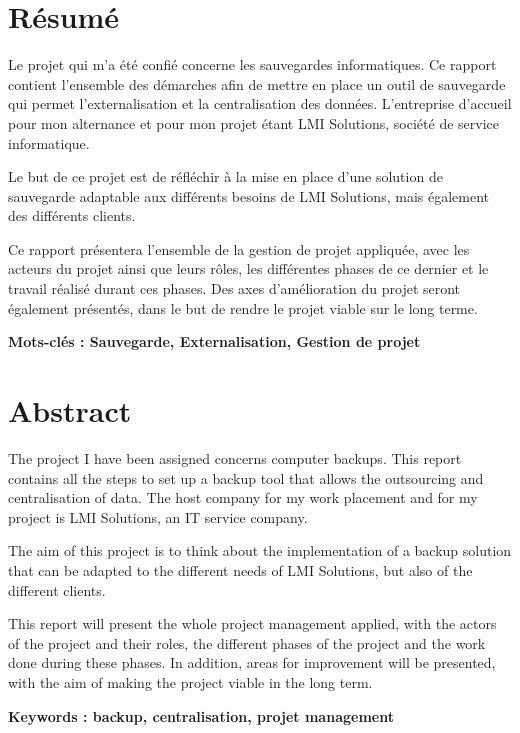 \documentclass[pfe]{tnreport} %
\begin{document}
\cleardoublepage

\listoffigures
\cleardoublepage

\listoftables
\cleardoublepage

\printglossary[type=\acronymtype]

\cleardoublepage
\renewcommand{\thesubsection}{\Roman{subsection}}

\appendix


\cleardoublepage
\thispagestyle{empty}

\section*{Résumé}

Le projet qui m'a été confié concerne les sauvegardes informatiques. Ce rapport contient l'ensemble des démarches  afin de mettre en place un outil de sauvegarde qui permet l'externalisation et la centralisation des données. L'entreprise d'accueil pour mon alternance et pour mon projet étant LMI Solutions, société de service informatique. 

Le but de ce projet est de réfléchir à la mise en place d'une solution de sauvegarde adaptable aux différents besoins de LMI Solutions, mais également des différents clients.

Ce rapport présentera l'ensemble de la gestion de projet appliquée, avec les acteurs du projet ainsi que leurs rôles, les différentes phases de ce dernier et le travail réalisé durant ces phases. Des axes d'amélioration du projet seront également présentés, dans le but de rendre le projet viable sur le long terme. 



{\bf Mots-clés : Sauvegarde, Externalisation, Gestion de projet}


\section*{Abstract}

The project I have been assigned concerns computer backups. This report contains all the steps to set up a backup tool that allows the outsourcing and centralisation of data. The host company for my work placement and for my project is LMI Solutions, an IT service company. 

The aim of this project is to think about the implementation of a backup solution that can be adapted to the different needs of LMI Solutions, but also of the different clients.

This report will present the whole project management applied, with the actors of the project and their roles, the different phases of the project and the work done during these phases. In addition, areas for improvement will be presented, with the aim of making the project viable in the long term. 


{\bf Keywords : backup, centralisation, projet management }
\end{document}
